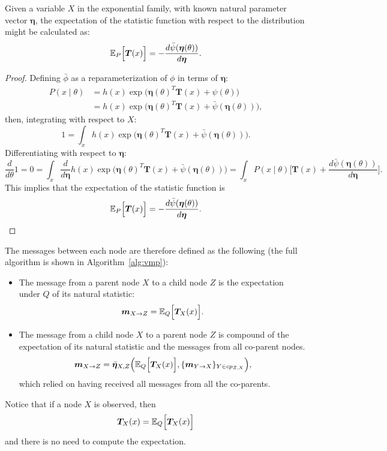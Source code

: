 \begin{proposition}\label{prop:vmp}
  Given a variable \(X\) in the exponential family, with known natural parameter vector \(\bm{\eta}\),  the expectation of the statistic function with respect to the distribution might be calculated as:
    \[
    \mathbb{E}_{P}\Big[\bm{T}(x)\Big] =   -  \frac{ d\bar{\psi}(\bm{\eta}(\theta)) }{d \bm{\eta}}.
  \]
\end{proposition}
\begin{proof}
  Defining \(\bar{\phi}\) as a reparameterization of \(\phi\) in terms of \(\bm{\eta}\):
  \[
    \begin{aligned}
      P(x\mid \theta) &= h(x)\exp \Big( \bm{\eta}{(\theta)}^{T}\bm{T}(x) + \psi(\theta) \Big)\\
       &= h(x)\exp \Big( \bm{\eta}{(\theta)}^{T}\bm{T}(x) + \bar{\psi}(\bm{\eta}(\theta)) \Big),
    \end{aligned}
  \]
  then, integrating with respect to \(X\):
  \[
    1 = \int_{x} h(x)\exp \Big( \bm{\eta}{(\theta)}^{T}\bm{T}(x) + \bar{\psi}(\bm{\eta}(\theta)) \Big).
  \]
  Differentiating with respect to \(\bm{\eta}\):
  \[
    \frac{d}{d\theta}1 = 0 = \int_{x} \frac{d}{d\bm{\eta}}h(x)\exp \Big( \bm{\eta}{(\theta)}^{T}\bm{T}(x) + \bar{\psi}(\bm{\eta}(\theta)) \Big) = \int_{x}P(x \mid \theta)\Big[ \bm{T}(x) + \frac{ d\bar{\psi}(\bm{\eta}(\theta)) }{d \bm{\eta}}\Big].
  \]
  This implies that the expectation of the statistic function is
  \[
    \mathbb{E}_{P}\Big[\bm{T}(x)\Big] =   -  \frac{ d\bar{\psi}(\bm{\eta}(\theta)) }{d \bm{\eta}}.
  \]
\end{proof}

The messages between each node are therefore defined as the following (the full algorithm is shown in Algorithm~\ref{alg:vmp}):
\begin{itemize}
  \item The message from a parent node \( X \) to a child node \( Z \) is the expectation under \( Q \) of its natural statistic:
    \[
    \bm{m}_{X \to Z} = \mathbb{E}_{Q}\Big[\bm{T}_{X}(x)\Big].
    \]
  \item The message from a child node \( X \) to a parent node \( Z \) is compound of the expectation of its natural statistic and the messages from all co-parent nodes.
    \[
    \bm{m}_{X \to Z} = \bar{\bm{\eta}}_{X,Z}\Big(\mathbb{E}_{Q}\Big[\bm{T}_X(x)\Big], \{\bm{m}_{Y \to X}\}_{Y \in cp_{Z,X}}\Big),
    \]
    which relied on having received all messages from all the co-parents.
\end{itemize}
Notice that if a node \(X\) is observed, then
\[
 \bm{T}_X(x) = \mathbb{E}_{Q}\Big[\bm{T}_X(x)\Big]
\]
and there is no need to compute the expectation.


